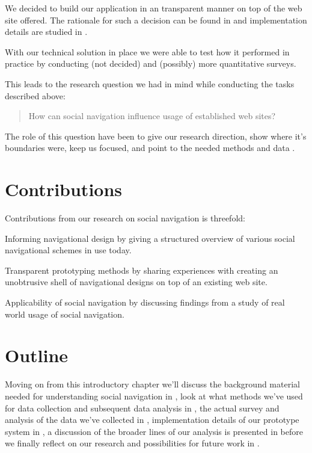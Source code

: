 We decided to build our application in an transparent manner on top of the
web site \urort offered. The rationale for such a decision can be found in
 and implementation details are studied
in .

With our technical solution in place we were able to test how it performed in
practice by conducting  (not decided) and
(possibly) more quantitative surveys.

This leads to the research question we had in mind while conducting
the tasks described above:

\begin{quote}
  How can social navigation influence usage of established web sites?
\end{quote}

The role of this question have been to give our research direction, show where
it's boundaries were, keep us focused, and point to the needed methods and
data \citep[p.~77]{silverman05}.


\section{Contributions}

Contributions from our research on social navigation is threefold:

\begin{enum}
  \item Informing navigational design by giving a structured overview of
    various social navigational schemes in use today.
  \item Transparent prototyping methods by sharing experiences with
    creating an unobtrusive shell of navigational designs on top of an
    existing web site.
  \item Applicability of social navigation by discussing findings from
    a study of real world usage of social navigation.
\end{enum}

\section{Outline}

Moving on from this introductory chapter we'll discuss the background
material needed for understanding social
navigation in , look at what methods we've
used for data collection and subsequent data analysis in
, the actual survey and analysis of the data
we've collected in , implementation details
of our prototype system in , a discussion of the
broader lines of our analysis is presented in 
before we finally reflect on our research and possibilities for future work
in .
